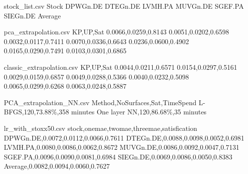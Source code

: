 \begin{filecontents*}{stock_list.csv}
Stock
DPWGn.DE
DTEGn.DE
LVMH.PA
MUVGn.DE
SGEF.PA
SIEGn.DE
Average
\end{filecontents*}

\begin{filecontents*}{pca_extrapolation.csv}
KP,UP,Sat
0.0066,0.0259,0.8143
0.0051,0.0202,0.6598
0.0032,0.0117,0.7411
0.0070,0.0336,0.6643
0.0236,0.0600,0.4902
0.0165,0.0290,0.7491
0.0103,0.0301,0.6865
\end{filecontents*}

\begin{filecontents*}{classic_extrapolation.csv}
KP,UP,Sat
0.0044,0.0211,0.6571
0.0154,0.0297,0.5161
0.0029,0.0159,0.6857
0.0049,0.0288,0.5366
0.0040,0.0232,0.5098
0.0065,0.0299,0.6268
0.0063,0.0248,0.5887
\end{filecontents*}

\begin{filecontents*}{PCA_extrapolation_NN.csv}
Method,NoSurfaces,Sat,TimeSpend
L-BFGS,120,73.88\%,358 minutes
One layer NN,120,86.68\%,35 minutes
\end{filecontents*}

\begin{filecontents*}{lr_with_stoxx50.csv}
stock,onemae,twomae,threemae,satisfication
DPWGn.DE,0.0072,0.0112,0.0066,0.7611
DTEGn.DE,0.0088,0.0098,0.0052,0.6981
LVMH.PA,0.0080,0.0086,0.0062,0.8672
MUVGn.DE,0.0086,0.0092,0.0047,0.7131
SGEF.PA,0.0096,0.0090,0.0081,0.6984
SIEGn.DE,0.0069,0.0086,0.0050,0.8383
Average,0.0082,0.0094,0.0060,0.7627
\end{filecontents*}
